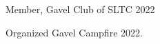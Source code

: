 \begin{cventries}
  \cventry
    {Member, Gavel Club of SLTC} %
    {} %
    {} %
    {2022} %
    {
      \begin{cvitems} %
        \item {Organized Gavel Campfire 2022.}
      \end{cvitems}
    }

\end{cventries}
